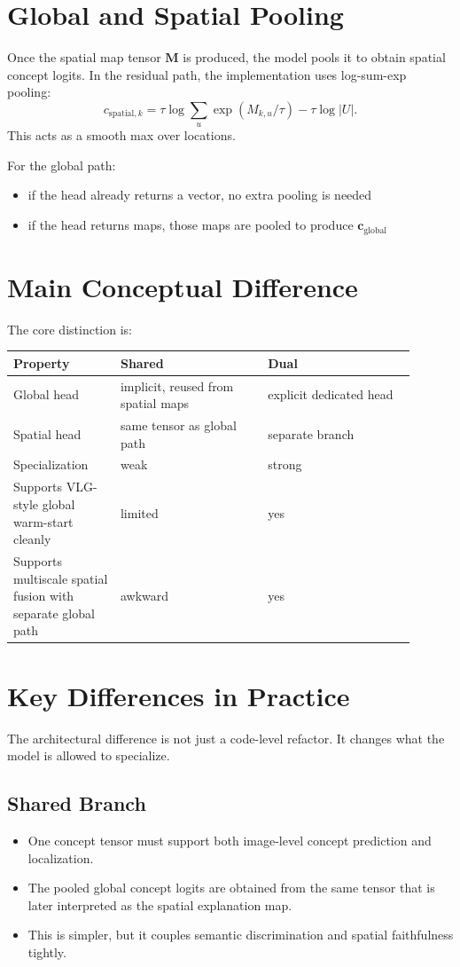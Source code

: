 \documentclass[11pt]{article}
\begin{document}
\section{Global and Spatial Pooling}
Once the spatial map tensor $\mathbf{M}$ is produced, the model pools it to
obtain spatial concept logits. In the residual path, the implementation uses
log-sum-exp pooling:
\[
c_{\mathrm{spatial},k}
=
\tau \log \sum_{u} \exp\!\left(M_{k,u}/\tau\right)
- \tau \log |U|.
\]
This acts as a smooth max over locations.

For the global path:
\begin{itemize}
    \item if the head already returns a vector, no extra pooling is needed
    \item if the head returns maps, those maps are pooled to produce
    $\mathbf{c}_{\mathrm{global}}$
\end{itemize}

\section{Main Conceptual Difference}
The core distinction is:
\begin{center}
\begin{tabular}{@{}p{0.24\linewidth}p{0.33\linewidth}p{0.33\linewidth}@{}}
\toprule
Property & Shared & Dual \\
\midrule
Global head & implicit, reused from spatial maps & explicit dedicated head \\
Spatial head & same tensor as global path & separate branch \\
Specialization & weak & strong \\
Supports VLG-style global warm-start cleanly & limited & yes \\
Supports multiscale spatial fusion with separate global path & awkward & yes \\
\bottomrule
\end{tabular}
\end{center}

\section{Key Differences in Practice}
The architectural difference is not just a code-level refactor. It changes what
the model is allowed to specialize.

\subsection{Shared Branch}
\begin{itemize}
    \item One concept tensor must support both image-level concept prediction
    and localization.
    \item The pooled global concept logits are obtained from the same tensor that
    is later interpreted as the spatial explanation map.
    \item This is simpler, but it couples semantic discrimination and spatial
    faithfulness tightly.
\end{itemize}
\end{document}
